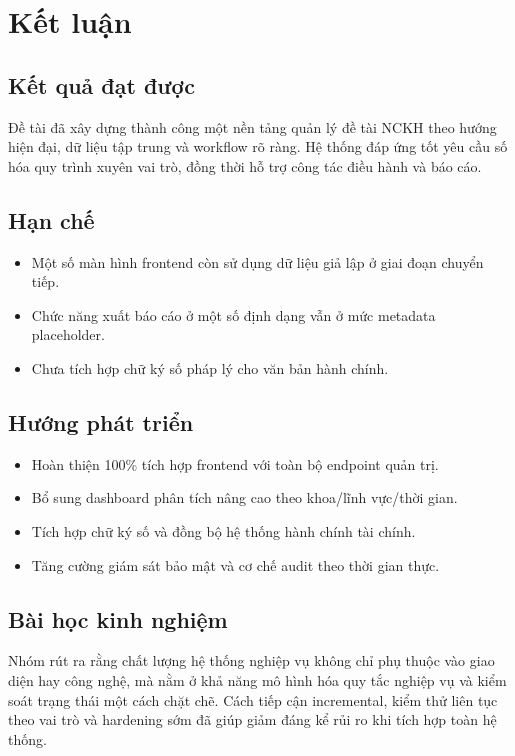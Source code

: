 \documentclass[12pt,a4paper]{report}
\begin{document}
\chapter{Kết luận}
\section{Kết quả đạt được}
Đề tài đã xây dựng thành công một nền tảng quản lý đề tài NCKH theo hướng hiện đại, dữ liệu tập trung và workflow rõ ràng. Hệ thống đáp ứng tốt yêu cầu số hóa quy trình xuyên vai trò, đồng thời hỗ trợ công tác điều hành và báo cáo.

\section{Hạn chế}
\begin{itemize}[leftmargin=1.2cm]
\item Một số màn hình frontend còn sử dụng dữ liệu giả lập ở giai đoạn chuyển tiếp.
\item Chức năng xuất báo cáo ở một số định dạng vẫn ở mức metadata placeholder.
\item Chưa tích hợp chữ ký số pháp lý cho văn bản hành chính.
\end{itemize}

\section{Hướng phát triển}
\begin{itemize}[leftmargin=1.2cm]
\item Hoàn thiện 100\% tích hợp frontend với toàn bộ endpoint quản trị.
\item Bổ sung dashboard phân tích nâng cao theo khoa/lĩnh vực/thời gian.
\item Tích hợp chữ ký số và đồng bộ hệ thống hành chính tài chính.
\item Tăng cường giám sát bảo mật và cơ chế audit theo thời gian thực.
\end{itemize}

\section{Bài học kinh nghiệm}
Nhóm rút ra rằng chất lượng hệ thống nghiệp vụ không chỉ phụ thuộc vào giao diện hay công nghệ, mà nằm ở khả năng mô hình hóa quy tắc nghiệp vụ và kiểm soát trạng thái một cách chặt chẽ. Cách tiếp cận incremental, kiểm thử liên tục theo vai trò và hardening sớm đã giúp giảm đáng kể rủi ro khi tích hợp toàn hệ thống.
\end{document}
